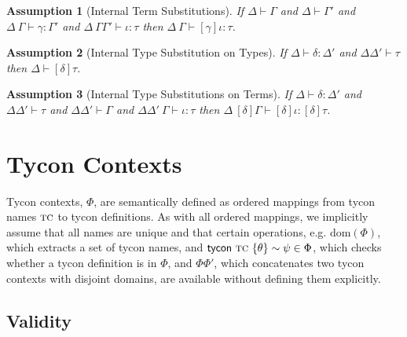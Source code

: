 \documentclass[12pt]{article}
\newtheorem{assumption}{Assumption}
\begin{document}
\begin{assumption}[Internal Term Substitutions] 
\label{assumption:internal-term-substituions}
If $\Delta \vdash \Gamma$ and $\Delta \vdash \Gamma'$ and $\Delta~\Gamma \vdash \gamma : \Gamma'$ and $\Delta~\Gamma\Gamma' \vdash \iota : \tau$ then $\Delta~\Gamma \vdash [\gamma]\iota : \tau$.
\end{assumption}

\begin{assumption}[Internal Type Substitution on Types]
\label{lemma:internal-type-substitution-on-types} If $\Delta \vdash \delta : \Delta'$ and $\Delta\Delta' \vdash \tau$ then $\Delta \vdash [\delta]\tau$.\end{assumption}


\begin{assumption}[Internal Type Substitutions on Terms] 
\label{lemma:internal-type-substitutions-on-terms}
If $\Delta \vdash \delta : \Delta'$ and $\Delta\Delta' \vdash \tau$ and $\Delta\Delta' \vdash \Gamma$ and $\Delta\Delta'~\Gamma \vdash \iota : \tau$ then $\Delta~[\delta]\Gamma \vdash [\delta]\iota : [\delta]\tau$.
\end{assumption}



\newpage
\section{Tycon Contexts}
Tycon contexts, $\Phi$, are semantically defined as ordered mappings from tycon names $\textsc{tc}$ to tycon definitions. As with all ordered mappings, we implicitly assume that all names are unique and that certain operations, e.g. $\text{dom}(\Phi)$, which extracts a set of tycon names, and ${\sf tycon}~\textsc{tc} ~\{\theta\} \sim \psi \in \Phi$, which checks whether a tycon definition is in $\Phi$, and $\Phi\Phi'$, which concatenates two tycon contexts with disjoint domains, are available without defining them explicitly. 

\subsection{Validity}
\end{document}
